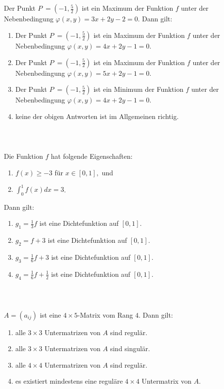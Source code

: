 \subsection*{}
Der Punkt $P \ = \left( -1, \frac{5}{2} \right)$ ist ein Maximum der Funktion $f$ unter der Nebenbedingung $\varphi(x,y) = 3x +2y -2 = 0$.
Dann gilt:
\renewcommand{\labelenumi}{(\alph{enumi})}
\begin{enumerate}
\item Der Punkt $P \ = \left( -1, \frac{5}{2} \right)$ ist ein Maximum der Funktion $f$ unter der Nebenbedingung $\varphi(x,y) = 4x +2y -1 = 0$.
\item Der Punkt $P \ = \left( -1, \frac{5}{2} \right)$ ist ein Maximum der Funktion $f$ unter der Nebenbedingung $\varphi(x,y) = 5x +2y -1 = 0$.
\item Der Punkt $P \ = \left( -1, \frac{5}{2} \right)$ ist ein Minimum der Funktion $f$ unter der Nebenbedingung $\varphi(x,y) = 4x +2y -1 = 0$.
\item keine der obigen Antworten ist im Allgemeinen richtig.
\end{enumerate}
\ \\
\subsection*{}
Die Funktion $f$ hat folgende Eigenschaften:
\renewcommand{\labelenumi}{(\roman{enumi})}
\begin{enumerate}
\item $f(x) \geq -3 $ für $x \in [0,1],$ und
\item $\int_0^1 f(x) dx = 3$.
\end{enumerate}
Dann gilt:
\renewcommand{\labelenumi}{(\alph{enumi})}
\begin{enumerate}
\item $g_1  =  \frac{1}{3} f $ ist eine Dichtefunktion auf $[0,1]$.
\item $g_2  =   f +3 $ ist eine Dichtefunktion auf $[0,1]$.
\item
$g_3  =  \frac{1}{6} f +3 $ ist eine Dichtefunktion auf $[0,1]$.
\item
$g_4  =  \frac{1}{6} f + \frac{1}{2} $ ist eine Dichtefunktion auf $[0,1]$.
\end{enumerate}
\ \\
\subsection*{}
$A = (a_{ij})$ ist eine $4 \times 5$-Matrix vom Rang $4$.
Dann gilt:
\renewcommand{\labelenumi}{(\alph{enumi})}
\begin{enumerate}
\item 
alle $3 \times 3$ Untermatrizen von $A$ sind regulär.
\item 
alle $3 \times 3$ Untermatrizen von $A$ sind singulär.
\item 
alle $4 \times 4$ Untermatrizen von $A$ sind regulär.
\item
es existiert mindestens eine reguläre $4 \times 4$ Untermatrix von $A$.
\end{enumerate}
\ \\
